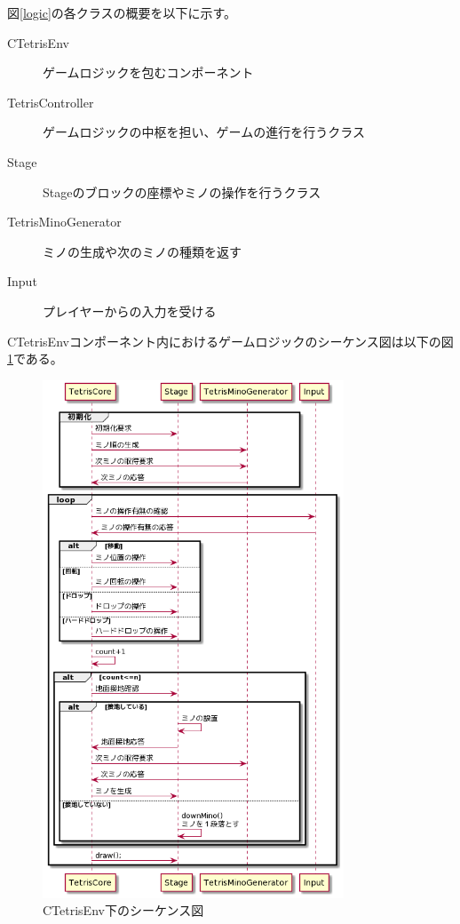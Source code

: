 \documentclass[a4paper,11pt]{jsarticle}
\begin{document}
図\ref{logic}の各クラスの概要を以下に示す。
\begin{description}
\item[CTetrisEnv] ゲームロジックを包むコンポーネント
\item[TetrisController] ゲームロジックの中枢を担い、ゲームの進行を行うクラス
\item[Stage] Stageのブロックの座標やミノの操作を行うクラス
\item[TetrisMinoGenerator] ミノの生成や次のミノの種類を返す
\item[Input] プレイヤーからの入力を受ける
\end{description}

CTetrisEnvコンポーネント内におけるゲームロジックのシーケンス図は以下の図\ref{sequence}である。

\begin{figure}[htbp]
\begin{center}
\includegraphics[width=0.8\textwidth]{sequence.png}
\caption{CTetrisEnv下のシーケンス図}
\label{sequence}
\end{center}
\end{figure}
\clearpage
\end{document}
